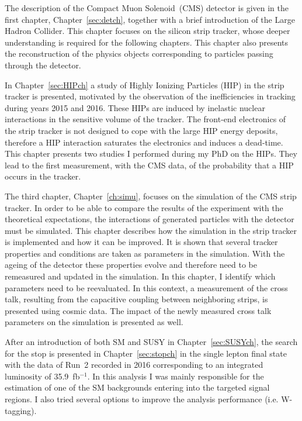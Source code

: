 The description of the Compact Muon Solenoid~(CMS) detector is given in the first chapter, Chapter~\ref{sec:detch}, together with a brief introduction of the Large Hadron Collider. This chapter focuses on the silicon strip tracker, whose deeper understanding is required for the following chapters. This chapter also presents the reconstruction of the physics objects corresponding to particles passing through the detector.

In Chapter~\ref{sec:HIPch} a study of Highly Ionizing Particles (HIP)  in the strip tracker is presented, motivated by the observation of the inefficiencies in tracking during years 2015 and 2016. These HIPs are induced by inelastic nuclear interactions in the sensitive volume of the tracker. The front-end electronics of the strip tracker is not designed to cope with the large HIP energy deposits, therefore a HIP interaction saturates the electronics and induces a dead-time. This chapter presents two studies I performed during my PhD on the HIPs. They lead to the first  measurement, with the CMS data, of the probability that a HIP occurs in the tracker.  

The third chapter, Chapter~\ref{ch:simu}, focuses on the simulation of the CMS strip tracker. In order to be able to compare the results of the experiment with the theoretical expectations, the interactions of generated particles with the detector must be simulated. This chapter describes how the simulation in the strip tracker is implemented and how it can be improved. It is shown that several tracker properties and conditions are taken as parameters in the simulation. With the ageing of the detector these properties evolve and therefore need to be remeasured and updated in the simulation. In this chapter, I identify which parameters need to be reevaluated. In this context, a measurement of the cross talk, resulting from the capacitive coupling between neighboring strips, is presented using cosmic data. The impact of the newly measured cross talk parameters on the simulation is presented as well.

After an introduction of both SM and SUSY in Chapter~\ref{sec:SUSYch}, the search for the stop is presented in Chapter~\ref{sec:stopch} in the single lepton final state with the data of Run~2 recorded in 2016 corresponding to an integrated luminosity of 35.9~fb$^{-1}$. In this analysis I was mainly responsible for the estimation of one of the SM backgrounds entering into the targeted signal regions. I also tried several options to improve the analysis performance (i.e. W-tagging). 


